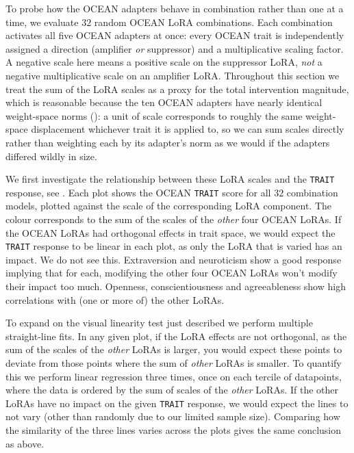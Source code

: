 To probe how the OCEAN adapters behave in combination rather than one at a
time, we evaluate $32$ random OCEAN LoRA combinations. Each combination activates
all five OCEAN adapters at once: every OCEAN trait is independently assigned a direction
(amplifier \emph{or} suppressor) and a multiplicative scaling factor. A negative scale here means a positive scale on the suppressor LoRA, \emph{not} a negative multiplicative scale on an amplifier LoRA. Throughout this section we treat the sum of the LoRA scales as a proxy for the total intervention magnitude, which is reasonable because the ten OCEAN adapters have nearly identical weight-space norms (): a unit of scale corresponds to roughly the same weight-space displacement whichever trait it is applied to, so we can sum scales directly rather than weighting each by its adapter's norm as we would if the adapters differed wildly in size.

We first investigate the relationship between these LoRA scales and the \texttt{TRAIT} response, see . Each plot shows the OCEAN \texttt{TRAIT} score for all $32$ combination models, plotted
against the scale of the corresponding LoRA component. The colour corresponds to the sum of the scales of the \emph{other} four OCEAN LoRAs. If the OCEAN LoRAs had orthogonal effects in trait space, we would expect the \texttt{TRAIT} response to be linear in each plot, as only the LoRA that is varied has an impact. We do not see this. Extraversion and neuroticism show a good response implying that for each, modifying the other four OCEAN LoRAs won't modify their impact too much. Openness, conscientiousness and agreeableness show high correlations with (one or more of) the other LoRAs. 

To expand on the visual linearity test just described we perform multiple straight-line fits. In any given plot, if the LoRA effects are not orthogonal, as the sum of the scales of the \emph{other} LoRAs is larger, you would expect these points to deviate from those points where the sum of \emph{other} LoRAs is smaller. To quantify this we perform linear regression three times, once on each tercile of datapoints, where the data is ordered by the sum of scales of the \emph{other} LoRAs. If the other LoRAs have no impact on the given \texttt{TRAIT} response, we would expect the lines to not vary (other than randomly due to our limited sample size). Comparing how the similarity of the three lines varies across the plots gives the same conclusion as above.

